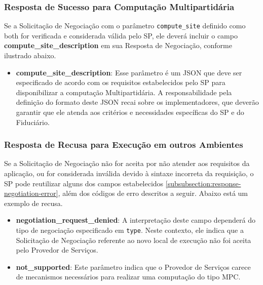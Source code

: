 

\subsubsection{Resposta de Sucesso para Computação Multipartidária}

Se a Solicitação de Negociação com o parâmetro \texttt{compute\_site} definido como both for verificada e considerada válida pelo \acs{SP}, ele deverá incluir o campo \textbf{compute\_site\_description} em sua Resposta de Negociação, conforme ilustrado abaixo.



\begin{itemize}
    \item \textbf{compute\_site\_description}: Esse parâmetro é um \acs{JSON} que deve ser especificado de acordo com os requisitos estabelecidos pelo \acs{SP} para disponibilizar a computação Multipartidária. A responsabilidade pela definição do formato deste \acs{JSON} recai sobre os implementadores, que deverão garantir que ele atenda aos critérios e necessidades específicas do \acs{SP} e do Fiduciário.
\end{itemize}

\subsubsection{Resposta de Recusa para Execução em outros Ambientes}

Se a Solicitação de Negociação não for aceita por não atender aos requisitos da aplicação, ou for considerada inválida devido à sintaxe incorreta da requisição, o \acs{SP} pode reutilizar alguns dos campos estabelecidos \autoref{subsubsection:response-negotiation-error}, além dos códigos de erro descritos a seguir. Abaixo está um exemplo de recusa.

\begin{itemize}
    \item \textbf{negotiation\_request\_denied}:  A interpretação deste campo dependerá do tipo de negociação especificado em \texttt{type}. Neste contexto, ele indica que a Solicitação de Negociação referente ao novo local de execução não foi aceita pelo Provedor de Serviços.

    \item \textbf{not\_supported}: Este parâmetro indica que o Provedor de Serviços carece de mecanismos necessários para realizar uma computação do tipo \acs{MPC}.
    
\end{itemize}

